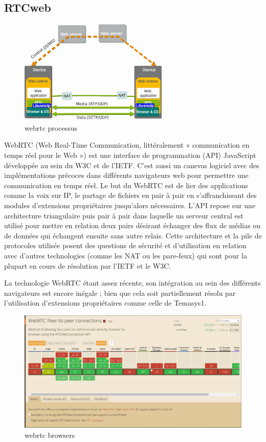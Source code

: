 \documentclass[oneside,12pt,a4paper]{book}
\begin{document}
\subsection{RTCweb}
\begin{figure}[ht]
\centering\includegraphics[width=0.7\linewidth]{webrtc.png}
\caption{webrtc processus}
\end{figure}
WebRTC (Web Real-Time Communication, littéralement « communication en temps réel pour le Web ») est une interface de programmation (API) JavaScript développée au sein du W3C et de l'IETF. C'est aussi un canevas logiciel avec des implémentations précoces dans différents navigateurs web pour permettre une communication en temps réel. Le but du WebRTC est de lier des applications comme la voix sur IP, le partage de fichiers en pair à pair en s'affranchissant des modules d'extensions propriétaires jusqu'alors nécessaires.
L'API repose sur une architecture triangulaire puis pair à pair dans laquelle un serveur central est utilisé pour mettre en relation deux pairs désirant échanger des flux de médias ou de données qui échangent ensuite sans autre relais. Cette architecture et la pile de protocoles utilisée posent des questions de sécurité et d'utilisation en relation avec d'autres technologies (comme les NAT ou les pare-feux) qui sont pour la plupart en cours de résolution par l'IETF et le W3C.

La technologie WebRTC étant assez récente, son intégration au sein des différents navigateurs est encore inégale ; bien que cela soit partiellement résolu par l'utilisation d'extensions propriétaires comme celle de Temasys1.
\begin{figure}[ht]
\centering\includegraphics[width=0.7\linewidth]{webrtcbrowser.png}
\caption{webrtc browsers}
\end{figure}
\end{document}
